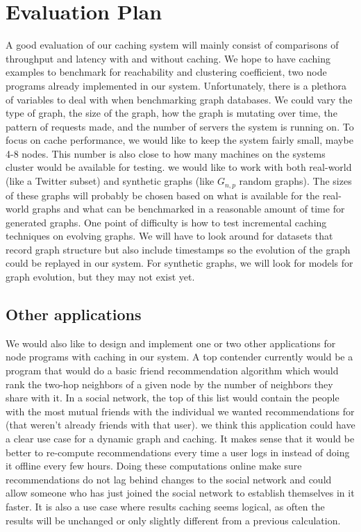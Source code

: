 \documentclass[letterpaper,twocolumn,11pt,tight]{article}
\begin{document}
\section{Evaluation Plan}\label{sec:design}
A good evaluation of our caching system will mainly consist of comparisons of throughput and latency with and without caching. We hope to have caching examples to benchmark for reachability and clustering coefficient, two node programs already implemented in our system. Unfortunately, there is a plethora of variables to deal with when benchmarking graph databases. We could vary the type of graph, the size of the graph, how the graph is mutating over time, the pattern of requests made, and the number of servers the system is running on. To focus on cache performance, we would like to keep the system fairly small, maybe 4-8 nodes. This number is also close to how many machines on the systems cluster would be available for testing. we would like to work with both real-world (like a Twitter subset) and synthetic graphs (like $G_{n,p}$ random graphs). The sizes of these graphs will probably be chosen based on what is available for the real-world graphs and what can be benchmarked in a reasonable amount of time for generated graphs. One point of difficulty is how to test incremental caching techniques on evolving graphs. We will have to look around for datasets that record graph structure but also include timestamps so the evolution of the graph could be replayed in our system. For synthetic graphs, we will look for models for graph evolution, but they may not exist yet.

\subsection{Other applications}
We would also like to design and implement one or two other applications for node programs with caching in our system. A top contender currently would be a program that would do a basic friend recommendation algorithm which would rank the two-hop neighbors of a given node by the number of neighbors they share with it. In a social network, the top of this list would contain the people with the most mutual friends with the individual we wanted recommendations for (that weren't already friends with that user). we think this application could have a clear use case for a dynamic graph and caching. It makes sense that it would be better to re-compute recommendations every time a user logs in instead of doing it offline every few hours. Doing these computations online make sure recommendations do not lag behind changes to the social network and could allow someone who has just joined the social network to establish themselves in it faster. It is also a use case where results caching seems logical, as often the results will be unchanged or only slightly different from a previous calculation.

\footnotesize

\end{document}
